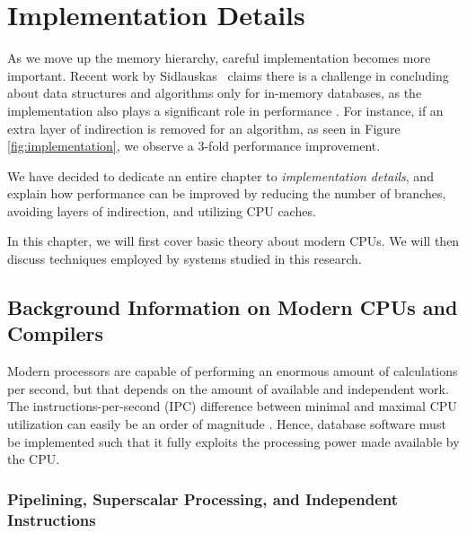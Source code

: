 \chapter{Implementation Details}
\label{chap:Implementation Details}

As we move up the memory hierarchy, careful implementation becomes more important. Recent work by Sidlauskas \ea~claims there is a challenge in concluding about data structures and algorithms only for in-memory databases, as the implementation also plays a significant role in performance \cite{Sidlauskas2014-ef}. For instance, if an extra layer of indirection is removed for an algorithm, as seen in Figure \ref{fig:implementation}, we observe a 3-fold performance improvement. 

We have decided to dedicate an entire chapter to \textit{implementation details}, and explain how performance can be improved by reducing the number of branches, avoiding layers of indirection, and utilizing CPU caches.

In this chapter, we will first cover basic theory about modern CPUs. We will then discuss techniques employed by systems studied in this research.

\newpage

\section{Background Information on Modern CPUs and Compilers}
\label{sec:Background Information on Modern CPUs and Compilers}
Modern processors are capable of performing an enormous amount of calculations per second, but that depends on the amount of available and independent work. The instructions-per-second (IPC) difference between minimal and maximal CPU utilization can easily be an order of magnitude \cite{Boncz2005-wj}. Hence, database software must be implemented such that it fully exploits the processing power made available by the CPU.

\subsection{Pipelining, Superscalar Processing, and Independent Instructions}
\label{sub:Pipelining, Superscalar Processing, and Independent Instructions}

